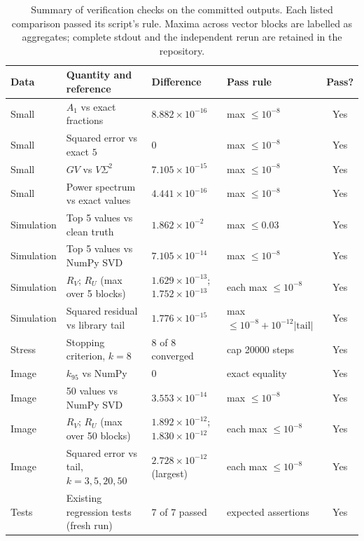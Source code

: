 \documentclass[11pt,letterpaper]{article}
\numberwithin{equation}{section}
\begin{document}
\begin{table}[H]
\centering\small
\caption{Summary of verification checks on the committed outputs. Each listed comparison passed its script's rule. Maxima across vector blocks are labelled as aggregates; complete stdout and the independent rerun are retained in the repository.}
\label{tab:verify}
\begin{tabularx}{\linewidth}{@{}P{1.75cm} L P{2.4cm} P{2.2cm} c@{}}\toprule
Data & Quantity and reference & Difference & Pass rule & Pass?\\\midrule
Small & $A_1$ vs exact fractions & $8.882\times10^{-16}$ & max $\le10^{-8}$ & Yes\\
Small & Squared error vs exact $5$ & $0$ & max $\le10^{-8}$ & Yes\\
Small & $GV$ vs $V\Sigma^2$ & $7.105\times10^{-15}$ & max $\le10^{-8}$ & Yes\\
Small & Power spectrum vs exact values & $4.441\times10^{-16}$ & max $\le10^{-8}$ & Yes\\\midrule
Simulation & Top 5 values vs clean truth & $1.862\times10^{-2}$ & max $\le0.03$ & Yes\\
Simulation & Top 5 values vs NumPy SVD & $7.105\times10^{-14}$ & max $\le10^{-8}$ & Yes\\
Simulation & $R_V$; $R_U$ (max over 5 blocks) & $1.629\times10^{-13}$; $1.752\times10^{-13}$ & each max $\le10^{-8}$ & Yes\\
Simulation & Squared residual vs library tail & $1.776\times10^{-15}$ & max $\le10^{-8}+10^{-12}|\mathrm{tail}|$ & Yes\\
Stress & Stopping criterion, $k=8$ & 8 of 8 converged & cap 20000 steps & Yes\\\midrule
Image & $k_{95}$ vs NumPy & $0$ & exact equality & Yes\\
Image & 50 values vs NumPy SVD & $3.553\times10^{-14}$ & max $\le10^{-8}$ & Yes\\
Image & $R_V$; $R_U$ (max over 50 blocks) & $1.892\times10^{-12}$; $1.830\times10^{-12}$ & each max $\le10^{-8}$ & Yes\\
Image & Squared error vs tail, $k=3,5,20,50$ & $2.728\times10^{-12}$ (largest) & each max $\le10^{-8}$ & Yes\\\midrule
Tests & Existing regression tests (fresh run) & 7 of 7 passed & expected assertions & Yes\\\bottomrule
\end{tabularx}
\end{table}
\end{document}

